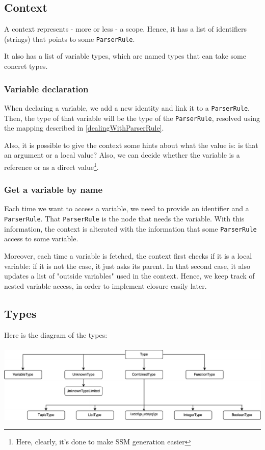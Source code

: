 \documentclass{article}
\newcommand\cc[1]{\lstinline{#1}}
\begin{document}
		\subsection{Context}
			A context represents - more or less - a scope. Hence, it has a list of identifiers (strings) that points to some \cc{ParserRule}.

			It also has a list of variable types, which are named types that can take some concret types.

			\subsubsection{Variable declaration}
				When declaring a variable, we add a new identity and link it to a \cc{ParserRule}. Then, the type of that variable will be the type of the \cc{ParserRule}, resolved using the mapping described in \ref{dealingWithParserRule}.

				Also, it is possible to give the context some hints about what the value is: is that an argument or a local value? Also, we can decide whether the variable is a reference or as a direct value\footnote{Here, clearly, it's done to make SSM generation easier}.
			\subsubsection{Get a variable by name}
				Each time we want to access a variable, we need to provide an identifier and a \cc{ParserRule}. That \cc{ParserRule} is the node that needs the variable. With this information, the context is alterated with the information that some \cc{ParserRule} access to some variable.

				Moreover, each time a variable is fetched, the context first checks if it is a local variable: if it is not the case, it just asks its parent. In that second case, it also updates a list of "outside variables" used in the context. Hence, we keep track of nested variable access, in order to implement closure easily later.
		\subsection{Types}
			Here is the diagram of the types:\\
			\vspace{0.2cm}\\
			\includegraphics[width=\textwidth]{diagram.pdf}
			\vspace{0.2cm}
\end{document}
